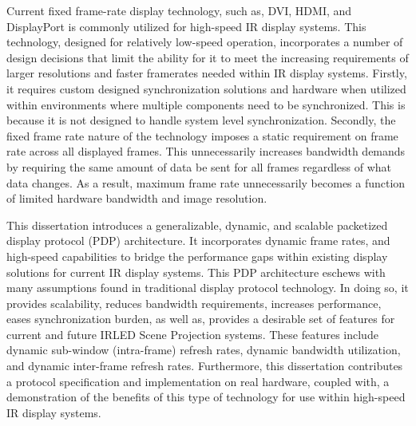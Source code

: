 Current fixed frame-rate display technology, such as, DVI, HDMI, and DisplayPort is commonly utilized for high-speed IR display systems. This technology, designed for relatively low-speed operation, incorporates a number of design decisions that limit the ability for it to meet the increasing requirements of larger resolutions and faster framerates needed within IR display systems. Firstly, it requires custom designed synchronization solutions and hardware when utilized within environments where multiple components need to be synchronized. This is because it is not designed to handle system level synchronization. Secondly, the fixed frame rate nature of the technology imposes a static requirement on frame rate across all displayed frames. This unnecessarily increases bandwidth demands by requiring the same amount of data be sent for all frames regardless of what data changes. As a result, maximum frame rate unnecessarily becomes a function of limited hardware bandwidth and image resolution.

This dissertation introduces a generalizable, dynamic, and scalable packetized display protocol (PDP) architecture. It incorporates dynamic frame rates, and high-speed capabilities to bridge the performance gaps within existing display solutions for current IR display systems. This PDP architecture eschews with many assumptions found in traditional display protocol technology. In doing so, it provides scalability, reduces bandwidth requirements, increases performance, eases synchronization burden, as well as, provides a desirable set of features for current and future IRLED Scene Projection systems. These features include dynamic sub-window (intra-frame) refresh rates, dynamic bandwidth utilization, and dynamic inter-frame refresh rates. Furthermore, this dissertation contributes a protocol specification and implementation on real hardware, coupled with, a demonstration of the benefits of this type of technology for use within high-speed IR display systems.
